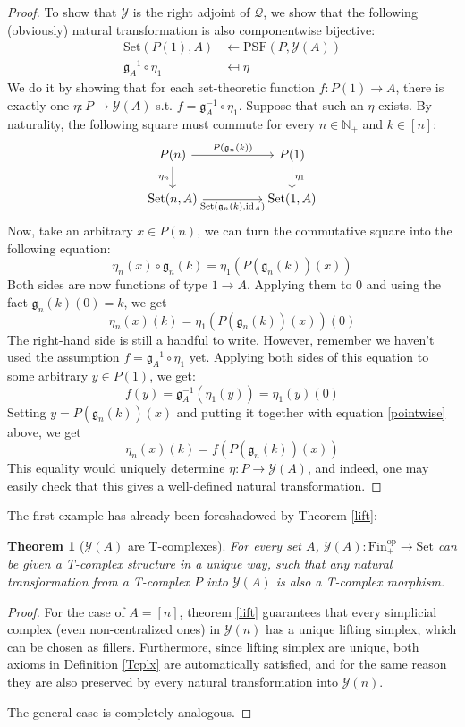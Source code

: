 \documentclass{article}
\newtheorem{theorem}{Theorem}[subsection]
\theoremstyle{remark}
\theoremstyle{definition}
\newcommand{\N}{\mathbb N}
\newcommand{\Fin}{\mathrm{Fin}}
\newcommand{\Set}{\mathrm{Set}}
\newcommand{\PSF}{\mathrm{PSF}}
\newcommand{\op}{\mathrm{op}}
\newcommand{\id}{\mathrm{id}}
\newcommand{\Y}{\mathcal Y}
\newcommand{\g}{\mathfrak g}
\newcommand{\Q}{\mathcal Q}
\begin{document}
\begin{proof}
		To show that $\Y$ is the right adjoint of $\Q$, we show that the following (obviously) natural transformation is also componentwise bijective:
		\begin{align*}
			\Set(P(1),A)&\gets\PSF(P,\Y(A))\\
			\g_A^{-1}\circ\eta_1&\mapsfrom\eta
		\end{align*}
		We do it by showing that for each set-theoretic function $f:P(1)\to A$, there is exactly one $\eta:P\to\Y(A)$ s.t. $f=\g_A^{-1}\circ\eta_1$. Suppose that such an $\eta$ exists. By naturality, the following square must commute for every $n\in\N_+$ and $k\in[n]$:
		\[\begin{tikzcd}
			P(n)\arrow{rr}{P(\g_n(k))}\arrow{d}[swap]{\eta_n}&&P(1)\arrow{d}{\eta_1}\\
			\Set(n,A)\arrow{rr}[swap]{\Set(\g_n(k),\id_A)}&&\Set(1,A)
		\end{tikzcd}\]
		Now, take an arbitrary $x\in P(n)$, we can turn the commutative square into the following equation:
		\[\eta_n(x)\circ\g_n(k)=\eta_1(P(\g_n(k))(x))\]
		Both sides are now functions of type $1\to A$. Applying them to 0 and using the fact $\g_n(k)(0)=k$, we get
		\begin{equation}\label{pointwise}
			\eta_n(x)(k)=\eta_1(P(\g_n(k))(x))(0)
		\end{equation}
		The right-hand side is still a handful to write. However, remember we haven't used the assumption $f=\g_A^{-1}\circ\eta_1$ yet. Applying both sides of this equation to some arbitrary $y\in P(1)$, we get:
		\[f(y)=\g_A^{-1}(\eta_1(y))=\eta_1(y)(0)\]
		Setting $y=P(\g_n(k))(x)$ and putting it together with equation \ref{pointwise} above, we get
		\[\eta_n(x)(k)=f(P(\g_n(k))(x))\]
		This equality would uniquely determine $\eta:P\to\Y(A)$, and indeed, one may easily check that this gives a well-defined natural transformation.
	\end{proof}
	The first example has already been foreshadowed by Theorem \ref{lift}:
	\begin{theorem}[$\Y(A)$ are T-complexes]\label{YTcplx}
		For every set $A$, $\Y(A):\Fin_+^\op\to\Set$ can be given a T-complex structure in a unique way, such that any natural transformation from a T-complex $P$ into $\Y(A)$ is also a T-complex morphism.
	\end{theorem}
	\begin{proof}
		For the case of $A=[n]$, theorem \ref{lift} guarantees that every simplicial complex (even non-centralized ones) in $\Y(n)$ has a unique lifting simplex, which can be chosen as fillers. Furthermore, since lifting simplex are unique, both axioms in Definition \ref{Tcplx} are automatically satisfied, and for the same reason they are also preserved by every natural transformation into $\Y(n)$.
		
		The general case is completely analogous.
	\end{proof}
\end{document}

